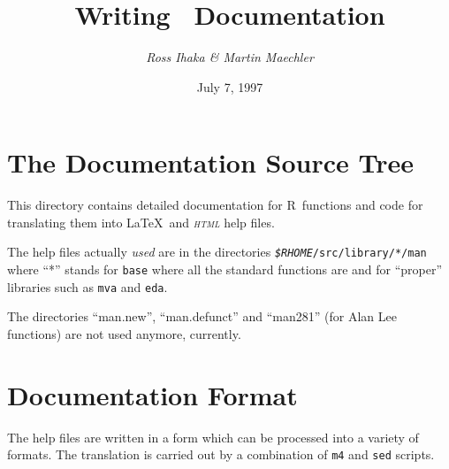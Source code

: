 \documentclass[a4paper,11pt]{article}
\title{\textbf{Writing \R\ Documentation}}
\author{\textit{Ross Ihaka \& Martin Maechler}}
\date{July 7, 1997}
\newcommand{\HTML}{\textsc{html}}
\newcommand{\R}{\textsc{R}}
\begin{document}
\maketitle

\section{The Documentation Source Tree}

This directory contains detailed documentation for \R\ functions and code
for translating them into \LaTeX\ and \emph{\HTML} help files.

The help files actually \emph{used} are in the directories
\texttt{\emph{\$RHOME}/src/library/*/man} where ``*'' stands for
\texttt{base} where all the standard functions are and for ``proper''
libraries such as \texttt{mva} and \texttt{eda}.

The directories ``man.new'', ``man.defunct'' and ``man281'' (for Alan Lee
functions) are not used anymore, currently.


\section{Documentation Format}\label{sec:doc-format}

The help files are written in a form which can be processed
into a variety of formats.  The translation is carried out
by a combination of \texttt{m4} and \texttt{sed} scripts.
\end{document}
